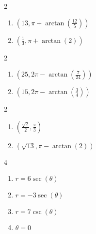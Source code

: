 \documentclass{ximera}
\begin{document}
\begin{multicols}{2}

\begin{enumerate}

\setcounter{enumi}{\value{HW}}

\item  $\left(13, \pi + \arctan\left(\frac{12}{5}\right) \right)$
\item  $\left(\frac{1}{3}, \pi + \arctan\left(2\right) \right)$ 

\setcounter{HW}{\value{enumi}}

\end{enumerate}

\end{multicols}

\begin{multicols}{2}

\begin{enumerate}

\setcounter{enumi}{\value{HW}}

\item  $\left(25, 2\pi - \arctan\left(\frac{7}{24}\right) \right)$
\item  $\left( 15, 2\pi - \arctan\left(\frac{3}{4} \right) \right)$

\setcounter{HW}{\value{enumi}}

\end{enumerate}

\end{multicols}

\begin{multicols}{2}

\begin{enumerate}

\setcounter{enumi}{\value{HW}}

\item  $\left(\frac{\sqrt{2}}{2}, \frac{\pi}{3}\right)$
\item  $\left(\sqrt{13}, \pi - \arctan(2) \right)$ 

\setcounter{HW}{\value{enumi}}

\end{enumerate}

\end{multicols}

\begin{multicols}{4}

\begin{enumerate}

\setcounter{enumi}{\value{HW}}

\item $r = 6\sec(\theta)$
\item $r = -3\sec(\theta)$
\item $r = 7\csc(\theta)$
\item $\theta = 0$ 

\setcounter{HW}{\value{enumi}}

\end{enumerate}

\end{multicols}
\end{document}
